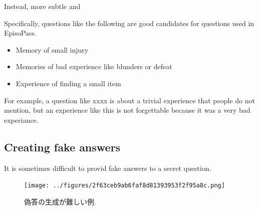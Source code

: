 \documentclass{article}
\begin{document}
\noindent
Instead, more subtle and

Specifically, questions like the following are good candidates for
questions used in EpisoPass.

\begin{itemize}
\item Memory of small injury

\vspace{-1mm}
\item Memories of bad experience like blunders or defeat

\vspace{-1mm}
\item Experience of finding a small item
\end{itemize}


For example, a question like xxxx is about a trivial experience
that people do not mention, but an experience like this is
not forgettable because it was a very bad experiance.

\subsection{Creating fake answers}


It is sometimes difficult to provid fake answers to a secret question.

\begin{figure}[H]
\centerline{\texttt{[image: ../figures/2f63ceb9ab6faf8d81393953f2f95a8c.png]}}
\caption{偽答の生成が難しい例.}
\label{atmega}
\end{figure}
\end{document}
